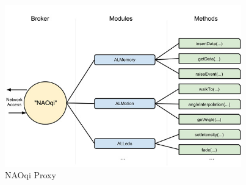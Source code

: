 \begin{figure}
	[h] \centering 
	\includegraphics[height=7cm]{figures/content/nao-proxy.jpg} \caption{NAOqi Proxy} \label{fg:nao:proxy} 
\end{figure}
